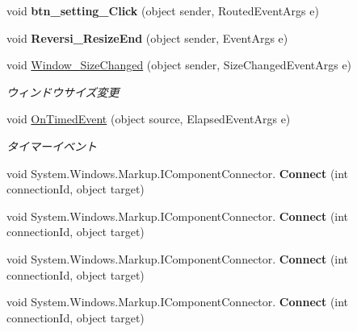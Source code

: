 \begin{DoxyCompactItemize}
void {\bfseries btn\+\_\+setting\+\_\+\+Click} (object sender, Routed\+Event\+Args e)
\item 
\mbox{\label{class_reversi_wpf_1_1_main_window_a451208a5e3c310d0fa5c81a2226daabf}} 
void {\bfseries Reversi\+\_\+\+Resize\+End} (object sender, Event\+Args e)
\item 
void \hyperlink{class_reversi_wpf_1_1_main_window_a2c8fea4e250e45b9f562f5e6710b46ff}{Window\+\_\+\+Size\+Changed} (object sender, Size\+Changed\+Event\+Args e)
\begin{DoxyCompactList}\small\item\em ウィンドウサイズ変更 \end{DoxyCompactList}\item 
void \hyperlink{class_reversi_wpf_1_1_main_window_a6cd816c500d85c09bcec5ff7d46c9a04}{On\+Timed\+Event} (object source, Elapsed\+Event\+Args e)
\begin{DoxyCompactList}\small\item\em タイマーイベント \end{DoxyCompactList}\item 
\mbox{\label{class_reversi_wpf_1_1_main_window_a829729c0f5b798ad441e8162fb58eb5e}} 
void System.\+Windows.\+Markup.\+I\+Component\+Connector. {\bfseries Connect} (int connection\+Id, object target)
\item 
\mbox{\label{class_reversi_wpf_1_1_main_window_a829729c0f5b798ad441e8162fb58eb5e}} 
void System.\+Windows.\+Markup.\+I\+Component\+Connector. {\bfseries Connect} (int connection\+Id, object target)
\item 
\mbox{\label{class_reversi_wpf_1_1_main_window_a829729c0f5b798ad441e8162fb58eb5e}} 
void System.\+Windows.\+Markup.\+I\+Component\+Connector. {\bfseries Connect} (int connection\+Id, object target)
\item 
\mbox{\label{class_reversi_wpf_1_1_main_window_a829729c0f5b798ad441e8162fb58eb5e}} 
void System.\+Windows.\+Markup.\+I\+Component\+Connector. {\bfseries Connect} (int connection\+Id, object target)
\end{DoxyCompactItemize}
